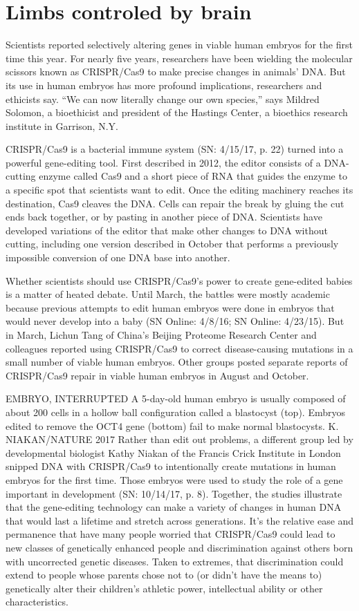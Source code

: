 \documentclass[12pt]{article}
\begin{document}
\section{Limbs controled by brain}
Scientists reported selectively altering genes in viable human embryos for the first time this year. For nearly five years, researchers have been wielding the molecular scissors known as CRISPR/Cas9 to make precise changes in animals’ DNA. But its use in human embryos has more profound implications, researchers and ethicists say.
“We can now literally change our own species,” says Mildred Solomon, a bioethicist and president of the Hastings Center, a bioethics research institute in Garrison, N.Y.

CRISPR/Cas9 is a bacterial immune system (SN: 4/15/17, p. 22) turned into a powerful gene-editing tool. First described in 2012, the editor consists of a DNA-cutting enzyme called Cas9 and a short piece of RNA that guides the enzyme to a specific spot that scientists want to edit. Once the editing machinery reaches its destination, Cas9 cleaves the DNA. Cells can repair the break by gluing the cut ends back together, or by pasting in another piece of DNA. Scientists have developed variations of the editor that make other changes to DNA without cutting, including one version described in October that performs a previously impossible conversion of one DNA base into another.

Whether scientists should use CRISPR/Cas9’s power to create gene-edited babies is a matter of heated debate. Until March, the battles were mostly academic because previous attempts to edit human embryos were done in embryos that would never develop into a baby (SN Online: 4/8/16; SN Online: 4/23/15). But in March, Lichun Tang of China’s Beijing Proteome Research Center and colleagues reported using CRISPR/Cas9 to correct disease-causing mutations in a small number of viable human embryos. Other groups posted separate reports of CRISPR/Cas9 repair in viable human embryos in August and October.


EMBRYO, INTERRUPTED A 5-day-old human embryo is usually composed of about 200 cells in a hollow ball configuration called a blastocyst (top). Embryos edited to remove the OCT4 gene (bottom) fail to make normal blastocysts.
K. NIAKAN/NATURE 2017
Rather than edit out problems, a different group led by developmental biologist Kathy Niakan of the Francis Crick Institute in London snipped DNA with CRISPR/Cas9 to intentionally create mutations in human embryos for the first time. Those embryos were used to study the role of a gene important in development (SN: 10/14/17, p. 8).
Together, the studies illustrate that the gene-editing technology can make a variety of changes in human DNA that would last a lifetime and stretch across generations. It’s the relative ease and permanence that have many people worried that CRISPR/Cas9 could lead to new classes of genetically enhanced people and discrimination against others born with uncorrected genetic diseases. Taken to extremes, that discrimination could extend to people whose parents chose not to (or didn’t have the means to) genetically alter their children’s athletic power, intellectual ability or other characteristics.
\end{document}
